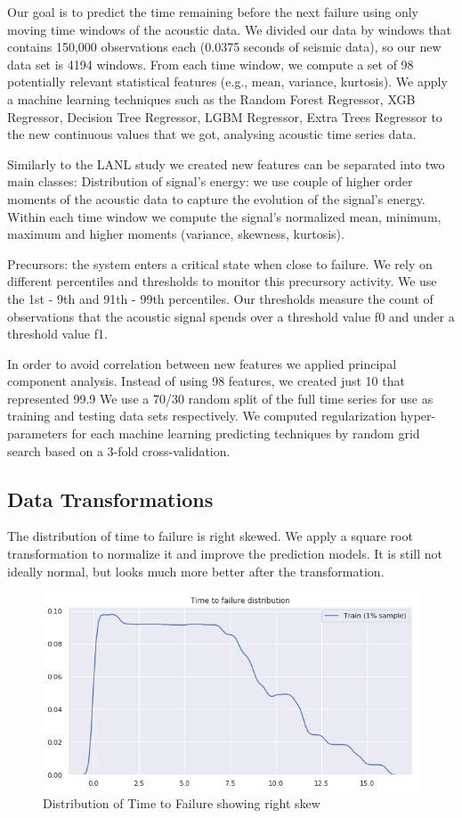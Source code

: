 \documentclass[]{llncs}
\begin{document}
Our goal is to predict the time remaining before the next failure using only moving time windows of the acoustic data. We divided our data by windows that contains 150,000 observations each (0.0375 seconds of seismic data), so our new data set is 4194 windows. From each time window, we compute a set of 98 potentially relevant statistical features (e.g., mean, variance, kurtosis). 
We apply a machine learning techniques such as the Random Forest Regressor, XGB Regressor,  Decision Tree Regressor, LGBM Regressor, Extra Trees Regressor to the new continuous values that we got, analysing acoustic time series data.\par
Similarly to the LANL study we created new features can be separated into two main classes: 
Distribution of signal’s energy: we use couple of higher order moments of the acoustic data to capture the evolution of the signal’s energy. Within each time window we compute the signal’s normalized mean, minimum, maximum and higher moments  (variance, skewness, kurtosis).\par
Precursors: the system enters a critical state when close to failure. We rely on different percentiles and thresholds to monitor this precursory activity. We use the 1st - 9th and 91th - 99th percentiles. Our thresholds measure the count of observations that the acoustic signal spends over a threshold value f0 and under a threshold value f1.

In order to avoid correlation between new features we applied principal component analysis.  Instead of using 98 features, we created just 10 that represented 99.9%
We use a 70/30 random split of the full time series for use as training and testing data sets respectively. We computed regularization hyper-parameters for each machine learning predicting techniques by random grid search based on a 3-fold cross-validation.
\subsection{Data Transformations}
The distribution of time to failure is right skewed. We apply a square root transformation to normalize it and improve the prediction models. It is still not ideally normal, but looks much more better after the transformation.
\begin{figure}
	\centering
	\includegraphics[width=1\linewidth]{../GPUProject/transform1}
	\caption{Distribution of Time to Failure showing right skew}
	\label{fig:morethan90percent}
\end{figure}
\end{document}

